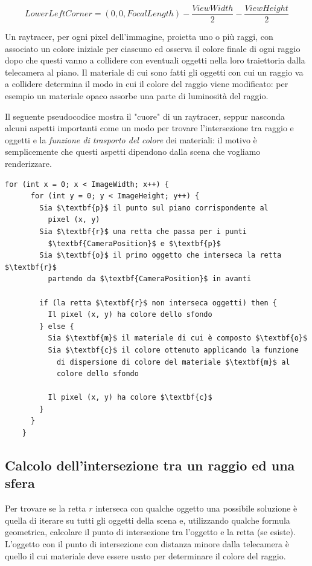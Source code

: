 \documentclass[12pt, twoside]{article}
\begin{document}
$$
  LowerLeftCorner = (0, 0, FocalLength) - \frac{ViewWidth}{2} - \frac{ViewHeight}{2}
$$

Un raytracer, per ogni pixel dell'immagine, proietta uno o più raggi, con
associato un colore iniziale per ciascuno ed osserva il colore finale di
ogni raggio dopo che questi vanno a collidere con eventuali oggetti nella
loro traiettoria dalla telecamera al piano.
Il materiale di cui sono fatti gli oggetti con cui un raggio va a collidere
determina il modo in cui il colore del raggio viene modificato: per esempio un
materiale opaco assorbe una parte di luminosità del raggio.

Il seguente pseudocodice mostra il "cuore" di un raytracer, seppur nasconda
alcuni aspetti importanti come un modo per trovare l'intersezione tra raggio
e oggetti e la \textit{funzione di trasporto del colore} dei materiali: il
motivo è semplicemente che questi aspetti dipendono dalla scena che vogliamo
renderizzare.

\begin{lstlisting}[mathescape=true]
    for (int x = 0; x < ImageWidth; x++) {
      for (int y = 0; y < ImageHeight; y++) {
        Sia $\textbf{p}$ il punto sul piano corrispondente al
          pixel (x, y)
        Sia $\textbf{r}$ una retta che passa per i punti
          $\textbf{CameraPosition}$ e $\textbf{p}$
        Sia $\textbf{o}$ il primo oggetto che interseca la retta $\textbf{r}$
          partendo da $\textbf{CameraPosition}$ in avanti

        if (la retta $\textbf{r}$ non interseca oggetti) then {
          Il pixel (x, y) ha colore dello sfondo
        } else {
          Sia $\textbf{m}$ il materiale di cui è composto $\textbf{o}$
          Sia $\textbf{c}$ il colore ottenuto applicando la funzione
            di dispersione di colore del materiale $\textbf{m}$ al
            colore dello sfondo
          
          Il pixel (x, y) ha colore $\textbf{c}$
        }
      }
    }
\end{lstlisting}

\subsection{Calcolo dell'intersezione tra un raggio ed una sfera}
Per trovare se la retta $r$ interseca con qualche oggetto una possibile
soluzione è quella di iterare su tutti gli oggetti della scena e, utilizzando
qualche formula geometrica, calcolare il punto di intersezione tra l'oggetto
e la retta (se esiste).
L'oggetto con il punto di intersezione con distanza minore dalla telecamera è
quello il cui materiale deve essere usato per determinare il colore del raggio.
\end{document}
